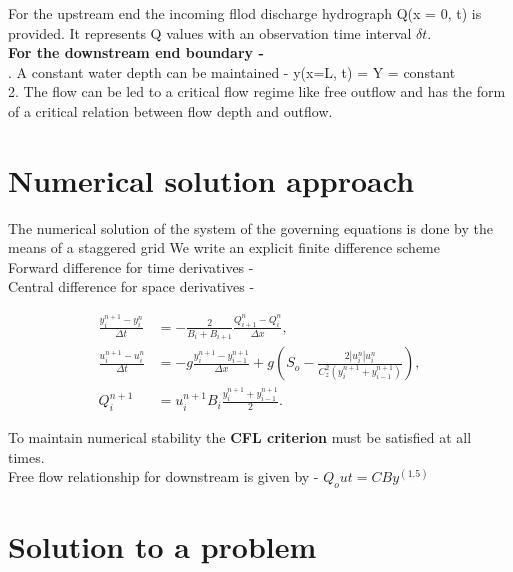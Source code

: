 \documentclass{article}
\begin{document}
\noindent
For the upstream end the incoming fllod discharge hydrograph Q(x = 0, t) is provided. It represents Q values
with an observation time interval \( \delta t\).\\

\noindent
\textbf{For the downstream end boundary - }\\

. A constant water depth can be maintained - y(x=L, t) = Y = constant\\
2. The flow can be led to a critical flow regime like free outflow and has the form of a critical 
relation between flow depth and outflow.

\section{Numerical solution approach}

The numerical solution of the system of the governing equations is done by the means of a staggered grid
We write an explicit finite difference scheme\\

\noindent
Forward difference for time derivatives - \\
\noindent
Central difference for space derivatives -

\begin{tcolorbox}[colback=pink!80!white, colframe=black, width=\textwidth, boxrule=0.5mm, sharp corners, left=1mm, right=1mm, top=1mm, bottom=1mm]
\begin{align*}
    \frac{y_i^{n+1} - y_i^n}{\Delta t} &= -\frac{2}{B_i + B_{i+1}} \frac{Q_{i+1}^n - Q_i^n}{\Delta x}, \\
    \frac{u_i^{n+1} - u_i^n}{\Delta t} &= -g \frac{y_i^{n+1} - y_{i-1}^{n+1}}{\Delta x} 
    + g \left( S_o - \frac{2 |u_i^n| u_i^n}{C_z^2 \left( y_i^{n+1} + y_{i-1}^{n+1} \right)} \right), \\
    Q_i^{n+1} &= u_i^{n+1} B_i \frac{y_i^{n+1} + y_{i-1}^{n+1}}{2}.
\end{align*}
\end{tcolorbox}

To maintain numerical stability the \textbf{CFL criterion} must be satisfied at all times.\\

\noindent
Free flow relationship for downstream is given by -  \( Q_out = CBy^(1.5) \)

\section{Solution to a problem }
\end{document}
